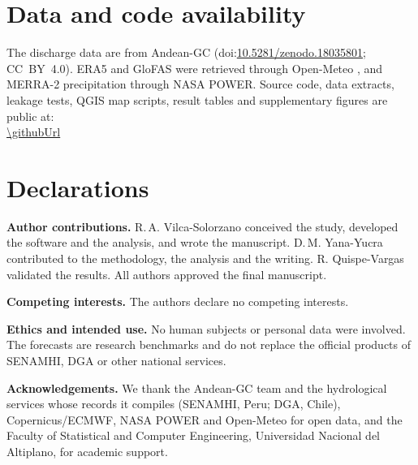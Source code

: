 \section*{Data and code availability}
The discharge data are from Andean-GC (doi:\href{https://doi.org/10.5281/zenodo.18035801}{10.5281/zenodo.18035801}; CC~BY~4.0). ERA5 and GloFAS were retrieved through Open-Meteo \cite{openmeteo}, and MERRA-2 precipitation through NASA POWER. Source code, data extracts, leakage tests, QGIS map scripts, result tables and supplementary figures are public at:\\ {\small\url{\githubUrl}}

\section*{Declarations}
\noindent\textbf{Author contributions.} R.\,A. Vilca-Solorzano conceived the study, developed the software and the analysis, and wrote the manuscript. D.\,M. Yana-Yucra contributed to the methodology, the analysis and the writing. R. Quispe-Vargas validated the results. All authors approved the final manuscript.

\smallskip\noindent\textbf{Competing interests.} The authors declare no competing interests.

\smallskip\noindent\textbf{Ethics and intended use.} No human subjects or personal data were involved. The forecasts are research benchmarks and do not replace the official products of SENAMHI, DGA or other national services.

\smallskip\noindent\textbf{Acknowledgements.} We thank the Andean-GC team and the hydrological services whose records it compiles (SENAMHI, Peru; DGA, Chile), Copernicus/ECMWF, NASA POWER and Open-Meteo for open data, and the Faculty of Statistical and Computer Engineering, Universidad Nacional del Altiplano, for academic support.
